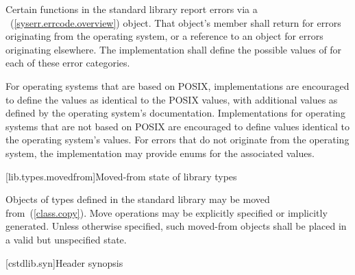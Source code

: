 \pnum
Certain functions in the \Cpp standard library report errors via a
~(\ref{syserr.errcode.overview}) object. That object's
 member shall return  for
errors originating from the operating system, or a reference to an
  object for errors originating elsewhere.
The implementation shall define the possible values of  for each of these
error categories. \begin{example} For operating systems that are based on POSIX,
implementations are encouraged to define the  values as
identical to the POSIX  values, with additional values as defined by the
operating system's documentation. Implementations for operating systems that are not
based on POSIX are encouraged to define values identical to the operating system's
values. For errors that do not originate from the operating system, the implementation
may provide enums for the associated values. \end{example}

[lib.types.movedfrom]{Moved-from state of library types}

\pnum
Objects of types defined in the \Cpp standard library may be moved
from~(\ref{class.copy}). Move operations may be explicitly specified or
implicitly generated. Unless otherwise specified, such moved-from objects shall
be placed in a valid but unspecified state.

[cstdlib.syn]{Header  synopsis}

